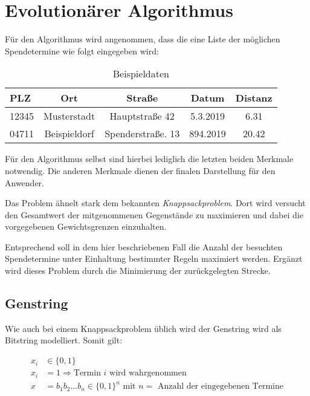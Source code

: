 \section{Evolutionärer Algorithmus}\label{sec:evol-alg}
Für den Algorithmus wird angenommen,
dass die eine Liste der möglichen Spendetermine wie folgt eingegeben wird:
\begin{table}[ht]
    \begin{center}
        \begin{tabular}{l|c|c|c|c}
            PLZ     & Ort               &  Straße               & Datum     & Distanz   \\
            \hline
            12345   & Musterstadt       & Hauptstraße 42        & 5.3.2019  & 6.31      \\
            04711   & Beispieldorf      & Spenderstraße. 13     & 894.2019  & 20.42     \\
        \end{tabular}
    \end{center}
    \caption{Beispieldaten}
\end{table}


Für den Algorithmus selbst sind hierbei lediglich die letzten beiden Merkmale notwendig.
Die anderen Merkmale dienen der finalen Darstellung für den Anwender.

Das Problem ähnelt stark dem bekannten \emph{Knappsackproblem}.
Dort wird versucht den Gesamtwert der mitgenommenen Gegenstände zu maximieren
und dabei die vorgegebenen Gewichtsgrenzen einzuhalten.

Entsprechend soll in dem hier beschriebenen Fall die Anzahl der besuchten Spendetermine unter
Einhaltung bestimmter Regeln maximiert werden.
Ergänzt wird dieses Problem durch die Minimierung der zurückgelegten Strecke.

\subsection{Genstring}
Wie auch bei einem Knappsackproblem üblich wird der Genstring wird als Bitstring modelliert.
Somit gilt:

\begin{equation}
    \label{eqn:genstring}
    \begin{split}
        x_i &\in \{ 0,1 \} \\
        x_i &= 1 \Rightarrow \text{Termin $i$ wird wahrgenommen} \\
        x   &= b_1b_2...b_n \in \{0,1\}^n\text{ mit $n = $ Anzahl der eingegebenen Termine}
    \end{split}
\end{equation}

